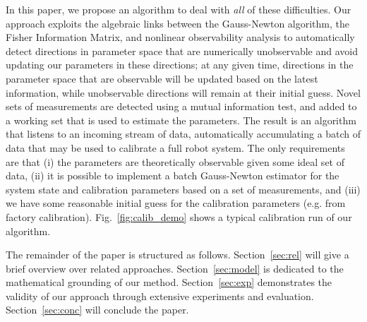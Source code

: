 In this paper, we propose an algorithm to deal with {\em all} of these
difficulties. Our approach exploits the algebraic links between the Gauss-Newton
algorithm, the Fisher Information Matrix, and nonlinear observability analysis
to automatically detect directions in parameter space that are numerically
unobservable and avoid updating our parameters in these directions; at any given
time, directions in the parameter space that are observable will be updated
based on the latest information, while unobservable directions will remain at
their initial guess. Novel sets of measurements are detected using a mutual
information test, and added to a working set that is used to estimate the
parameters. The result is an algorithm that listens to an incoming stream of
data, automatically accumulating a batch of data that may be used to calibrate a
full robot system. The only requirements are that (i) the parameters are
theoretically observable given some ideal set of data, (ii) it is possible to
implement a batch Gauss-Newton estimator for the system state and calibration
parameters based on a set of measurements, and (iii) we have some reasonable
initial guess for the calibration parameters (e.g. from factory calibration).
Fig.~\ref{fig:calib_demo} shows a typical calibration run of our algorithm.

The remainder of the paper is structured as follows. Section~\ref{sec:rel}
will give a brief overview over related approaches. Section~\ref{sec:model} is
dedicated to the mathematical grounding of our method.
Section~\ref{sec:exp} demonstrates the validity of our approach through
extensive experiments and evaluation. Section~\ref{sec:conc} will conclude the
paper.
